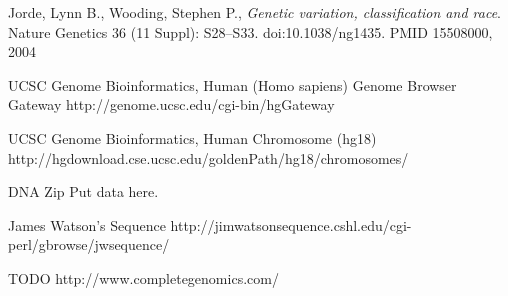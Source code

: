 \documentclass{article}
\begin{document}
\clearpage

\begin{thebibliography}{}

  Jorde, Lynn B., Wooding, Stephen P.,
  \emph{Genetic variation, classification and race}.
  Nature Genetics 36 (11 Suppl): S28–S33. doi:10.1038/ng1435. PMID 15508000,
  2004

  UCSC Genome Bioinformatics, Human (Homo sapiens) Genome Browser Gateway
  http://genome.ucsc.edu/cgi-bin/hgGateway

  UCSC Genome Bioinformatics, Human Chromosome (hg18)
  http://hgdownload.cse.ucsc.edu/goldenPath/hg18/chromosomes/

  DNA Zip
  Put data here.

  James Watson's Sequence
  http://jimwatsonsequence.cshl.edu/cgi-perl/gbrowse/jwsequence/

  TODO
  http://www.completegenomics.com/ 
\end{thebibliography}
\end{document}
